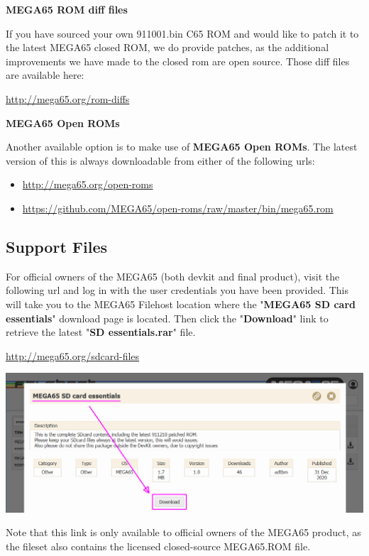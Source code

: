 \textbf{MEGA65 ROM diff files}

If you have sourced your own 911001.bin C65 ROM and would like to patch it to the latest MEGA65 closed ROM, 
we do provide patches, as the additional improvements we have made to the closed rom are open source. 
Those diff files are available here:

\url{http://mega65.org/rom-diffs}

\textbf{MEGA65 Open ROMs}

Another available option is to make use of \textbf{MEGA65 Open ROMs}. The latest version of this is always downloadable from either of the following urls:

\begin{itemize}
  \item \url{http://mega65.org/open-roms}
  \item \url{https://github.com/MEGA65/open-roms/raw/master/bin/mega65.rom}
\end{itemize}


\subsection{Support Files}

For official owners of the MEGA65 (both devkit and final product), visit the following url and log in with the user credentials you have been provided. This will take you to the MEGA65 Filehost location where the "\textbf{MEGA65 SD card essentials}" download page is located. Then click the "\textbf{Download}" link to retrieve the latest "\textbf{SD essentials.rar}" file.

\url{http://mega65.org/sdcard-files}

\includegraphics[width=\linewidth]{images/latest_support_files_with_closedrom.png}

Note that this link is only available to official owners of the MEGA65 product, as the fileset also contains the licensed closed-source MEGA65.ROM file.

